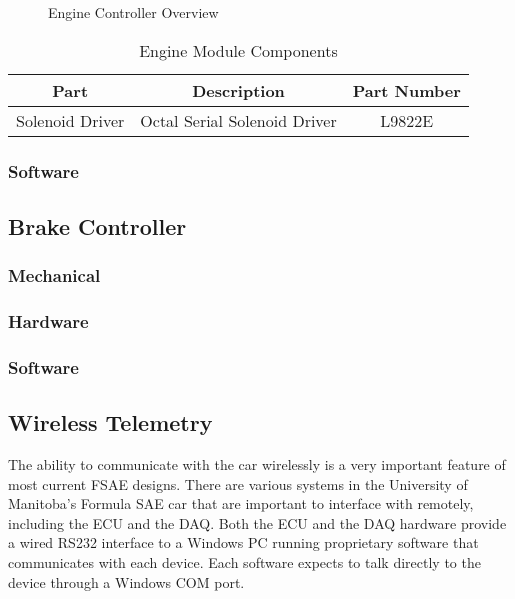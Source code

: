   \begin{figure}[H]
    \begin{centering}
      
    \end{centering}

    \caption{Engine Controller Overview\label{fig:Engine-Module-Overview}}
  \end{figure}

  \begin{table}[H]
    \caption{Engine Module Components\label{tab:Engine-Module}}
    \begin{centering}
      \begin{tabular}{|c|c|c|}
	\hline 
	Part & Description & Part Number\tabularnewline
	\hline
	\hline
	Solenoid Driver & Octal Serial Solenoid Driver & L9822E\tabularnewline
	\hline
      \end{tabular}
    \end{centering}
  \end{table}


\subsubsection{Software}

%
%
\subsection{Brake Controller}

\subsubsection{Mechanical}
\subsubsection{Hardware}
\subsubsection{Software}

%
%
\subsection{Wireless Telemetry}

The ability to communicate with the car wirelessly is a very important feature of most current FSAE designs. There are various systems in the University of Manitoba's Formula SAE car that are important to interface with remotely, including the ECU and the DAQ. Both the ECU and the DAQ hardware provide a wired RS232 interface to a Windows PC running proprietary software that communicates with each device. Each software expects to talk directly to the device through a Windows COM port.

